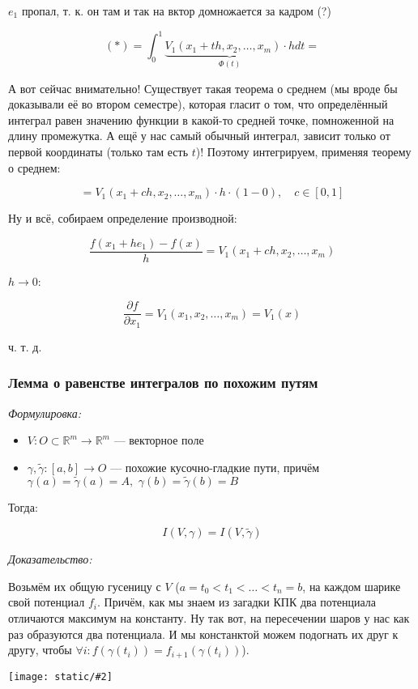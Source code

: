 \documentclass{article}
\def\dbl{\,\,}
\def\images#1#2{\begin{center}\texttt{[image: static/\#2]}\end{center}}
\begin{document}
$e_1$ пропал, т. к. он там и так на вктор домножается за кадром (?)

\[(*) = \int_{0}^{1} \underbrace{V_1(x_1 + th, x_2, \ldots, x_m) \cdot h}_{\Phi(t)}dt =\]

А вот сейчас внимательно! Существует такая теорема о среднем (мы вроде бы доказывали её во втором семестре), которая гласит о том, что определённый интеграл равен значению функции в какой-то средней точке, помноженной на длину промежутка. А ещё у нас самый обычный интеграл, зависит только от первой координаты (только там есть $t$)! Поэтому интегрируем, применяя теорему о среднем:

\[ = V_1(x_1 + ch, x_2, \ldots, x_m) \cdot h \cdot (1 - 0), \quad c \in [0, 1]\]

Ну и всё, собираем определение производной:

\[\frac{f(x_1 + he_1) - f(x)}{h} = V_1(x_1 + ch, x_2, \ldots, x_m)\]

$h \rightarrow 0$:

\[\frac{\partial f}{\partial x_1} = V_1(x_1, x_2, \ldots, x_m) = V_1(x)\]

ч. т. д. 

\subsubsection{Лемма о равенстве интегралов по похожим путям}
\textit{Формулировка:}

\begin{itemize}
    \item $V: O \subset \mathbb{R}^m \rightarrow \mathbb{R}^m$ --- векторное поле
    \item $\gamma, \tilde{\gamma}: [a, b] \rightarrow O$ --- похожие кусочно-гладкие пути, причём $\gamma(a) = \tilde{\gamma}(a) = A, \dbl \gamma(b) = \tilde{\gamma}(b) = B$
\end{itemize}

Тогда:

\[I(V, \gamma) = I(V, \tilde{\gamma})\]

\textit{Доказательство:}

Возьмём их общую гусеницу с $V$ ($a = t_0 < t_1 < \ldots < t_n = b$, на каждом шарике свой потенциал $f_i$. Причём, как мы знаем из загадки КПК два потенциала отличаются максимум на константу. Ну так вот, на пересечении шаров у нас как раз образуются два потенциала. И мы констанктой можем подогнать их друг к другу, чтобы $\forall i: f(\gamma(t_i)) = f_{i + 1}(\gamma(t_i))$).

\images{0.5}{lemm_pohoshie_putiii.jpg}
\end{document}

